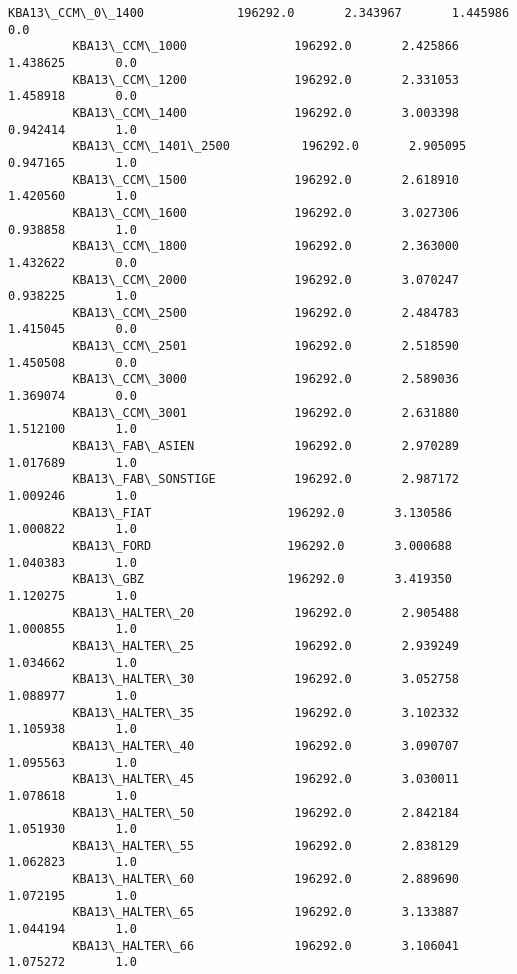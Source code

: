 \documentclass[11pt]{article}
\begin{document}
\begin{Verbatim}[commandchars=\\\{\}]
         KBA13\_CCM\_0\_1400             196292.0       2.343967       1.445986       0.0   
         KBA13\_CCM\_1000               196292.0       2.425866       1.438625       0.0   
         KBA13\_CCM\_1200               196292.0       2.331053       1.458918       0.0   
         KBA13\_CCM\_1400               196292.0       3.003398       0.942414       1.0   
         KBA13\_CCM\_1401\_2500          196292.0       2.905095       0.947165       1.0   
         KBA13\_CCM\_1500               196292.0       2.618910       1.420560       1.0   
         KBA13\_CCM\_1600               196292.0       3.027306       0.938858       1.0   
         KBA13\_CCM\_1800               196292.0       2.363000       1.432622       0.0   
         KBA13\_CCM\_2000               196292.0       3.070247       0.938225       1.0   
         KBA13\_CCM\_2500               196292.0       2.484783       1.415045       0.0   
         KBA13\_CCM\_2501               196292.0       2.518590       1.450508       0.0   
         KBA13\_CCM\_3000               196292.0       2.589036       1.369074       0.0   
         KBA13\_CCM\_3001               196292.0       2.631880       1.512100       1.0   
         KBA13\_FAB\_ASIEN              196292.0       2.970289       1.017689       1.0   
         KBA13\_FAB\_SONSTIGE           196292.0       2.987172       1.009246       1.0   
         KBA13\_FIAT                   196292.0       3.130586       1.000822       1.0   
         KBA13\_FORD                   196292.0       3.000688       1.040383       1.0   
         KBA13\_GBZ                    196292.0       3.419350       1.120275       1.0   
         KBA13\_HALTER\_20              196292.0       2.905488       1.000855       1.0   
         KBA13\_HALTER\_25              196292.0       2.939249       1.034662       1.0   
         KBA13\_HALTER\_30              196292.0       3.052758       1.088977       1.0   
         KBA13\_HALTER\_35              196292.0       3.102332       1.105938       1.0   
         KBA13\_HALTER\_40              196292.0       3.090707       1.095563       1.0   
         KBA13\_HALTER\_45              196292.0       3.030011       1.078618       1.0   
         KBA13\_HALTER\_50              196292.0       2.842184       1.051930       1.0   
         KBA13\_HALTER\_55              196292.0       2.838129       1.062823       1.0   
         KBA13\_HALTER\_60              196292.0       2.889690       1.072195       1.0   
         KBA13\_HALTER\_65              196292.0       3.133887       1.044194       1.0   
         KBA13\_HALTER\_66              196292.0       3.106041       1.075272       1.0   

\end{Verbatim}
\end{document}
